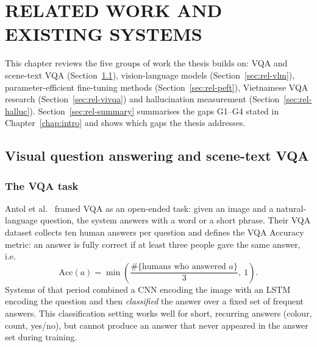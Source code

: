 
\chapter{RELATED WORK AND EXISTING SYSTEMS}
\label{chap:related}

\ifpdf
    \graphicspath{{Chapter3/Figs/Raster/}{Chapter3/Figs/PDF/}{Chapter3/Figs/}}
\else
    \graphicspath{{Chapter3/Figs/Vector/}{Chapter3/Figs/}}
\fi


This chapter reviews the five groups of work the thesis builds on: VQA and scene-text
VQA (Section~\ref{sec:rel-vqa}), vision-language models (Section~\ref{sec:rel-vlm}),
parameter-efficient fine-tuning methods (Section~\ref{sec:rel-peft}), Vietnamese VQA
research (Section~\ref{sec:rel-vivqa}) and hallucination measurement
(Section~\ref{sec:rel-halluc}). Section~\ref{sec:rel-summary} summarises the gaps
G1--G4 stated in Chapter~\ref{chap:intro} and shows which gaps the thesis addresses.

\section{Visual question answering and scene-text VQA}
\label{sec:rel-vqa}

\subsection{The VQA task}

Antol et al.~\cite{antol2015vqa} framed VQA as an open-ended task: given an image and
a natural-language question, the system answers with a word or a short phrase. Their
VQA dataset collects ten human answers per question and defines the VQA Accuracy
metric: an answer is fully correct if at least three people gave the same answer,
i.e.\
\begin{equation}
  \mathrm{Acc}(a) = \min\left(\frac{\#\{\text{humans who answered } a\}}{3},\ 1\right).
  \label{eq:vqaacc}
\end{equation}
Systems of that period combined a CNN encoding the image with an LSTM encoding the question and
then \emph{classified} the answer over a fixed set of frequent answers. This
classification setting works well for short, recurring answers (colour, count,
yes/no), but cannot produce an answer that never appeared in the answer set during
training.

